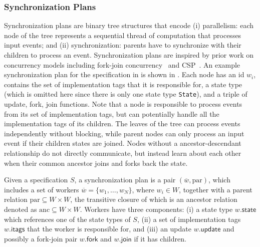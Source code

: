 \subsubsection{Synchronization Plans}
\label{ssec:distributed-configurations}

Synchronization plans are binary tree structures that encode (i)
parallelism: each node of the tree represents a sequential thread of
computation that processes input events; and (ii) synchronization:
parents have to synchronize with their children to process an event.
Synchronization plans are inspired by prior work on concurrency
models including fork-join concurrency~\cite{frigo1998implementation,lea2000java} and
CSP~\cite{hoare1978communicating}. An example synchronization plan for
the specification in  is shown in
.  Each node has an id $w_i$, contains
the set of implementation tags that it is responsible for, a state
type (which is omitted here since there is only one state type
\texttt{State}), and a triple of update, fork, join functions.
Note that a node is responsible to process events from its set of
implementation tags, but can potentially handle all the implementation
tags of its children. The leaves of the tree can process events
independently without blocking, while parent nodes can only process an
input event if their children states are joined. Nodes without a
ancestor-descendant relationship do not directly communicate, but
instead learn about each other when their common ancestor
joins and forks back the state.

\newcommand{\wfield}[2]{{#1}.{\mathsf{#2}}}

\begin{definition}
  Given a specification $S$,
  a synchronization plan is a pair $(\overline{w}, \mathrm{par})$,
  which includes a set of workers $\overline{w} = \{ w_1, \ldots, w_N \}$,
  where $w_i \in W$,
  together with a parent relation $\mathrm{par} \subseteq W \times W$,
    the transitive closure of which is an ancestor relation denoted as
    $\mathrm{anc} \subseteq W \times W$.
  Workers have three components:
    (i) a state type $\wfield{w}{state}$ which references one of the state types of $S$,
    (ii) a set of implementation tags $\wfield{w}{itags}$ that the worker is responsible for,
    and (iii) an update $\wfield{w}{update}$ and possibly a fork-join pair $\wfield{w}{fork}$ and $\wfield{w}{join}$ if it has children.
\end{definition}

